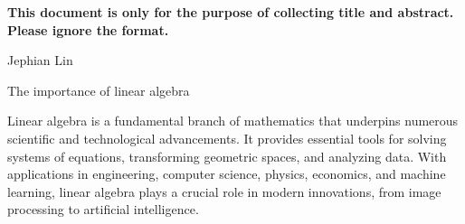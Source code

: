 \documentclass{article}
\begin{document}
{\bf This document is only for the purpose of collecting title and abstract.
Please ignore the format.}

Jephian Lin

The importance of linear algebra

Linear algebra is a fundamental branch of mathematics that underpins numerous scientific and technological advancements. It provides essential tools for solving systems of equations, transforming geometric spaces, and analyzing data. With applications in engineering, computer science, physics, economics, and machine learning, linear algebra plays a crucial role in modern innovations, from image processing to artificial intelligence. 
\end{document}
